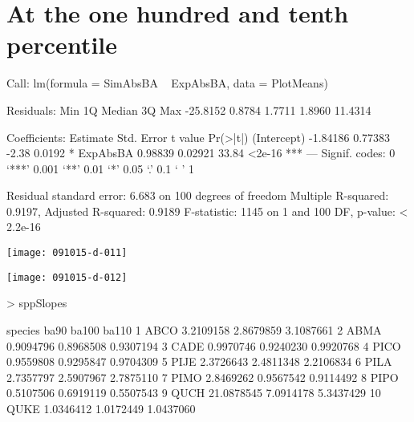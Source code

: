 \documentclass{article}
\begin{document}
\newpage
\section{At the one hundred and tenth percentile}
\begin{Schunk}
\begin{Soutput}
Call:
lm(formula = SimAbsBA ~ ExpAbsBA, data = PlotMeans)

Residuals:
     Min       1Q   Median       3Q      Max 
-25.8152   0.8784   1.7711   1.8960  11.4314 

Coefficients:
            Estimate Std. Error t value Pr(>|t|)    
(Intercept) -1.84186    0.77383   -2.38   0.0192 *  
ExpAbsBA     0.98839    0.02921   33.84   <2e-16 ***
---
Signif. codes:  0 ‘***’ 0.001 ‘**’ 0.01 ‘*’ 0.05 ‘.’ 0.1 ‘ ’ 1

Residual standard error: 6.683 on 100 degrees of freedom
Multiple R-squared:  0.9197,	Adjusted R-squared:  0.9189 
F-statistic:  1145 on 1 and 100 DF,  p-value: < 2.2e-16
\end{Soutput}
\end{Schunk}
\texttt{[image: 091015-d-011]}

\texttt{[image: 091015-d-012]}
\begin{Schunk}
\begin{Sinput}
>   sppSlopes
\end{Sinput}
\begin{Soutput}
   species       ba90     ba100     ba110
1     ABCO  3.2109158 2.8679859 3.1087661
2     ABMA  0.9094796 0.8968508 0.9307194
3     CADE  0.9970746 0.9240230 0.9920768
4     PICO  0.9559808 0.9295847 0.9704309
5     PIJE  2.3726643 2.4811348 2.2106834
6     PILA  2.7357797 2.5907967 2.7875110
7     PIMO  2.8469262 0.9567542 0.9114492
8     PIPO  0.5107506 0.6919119 0.5507543
9     QUCH 21.0878545 7.0914178 5.3437429
10    QUKE  1.0346412 1.0172449 1.0437060
\end{Soutput}
\end{Schunk}






\newpage
\end{document}
